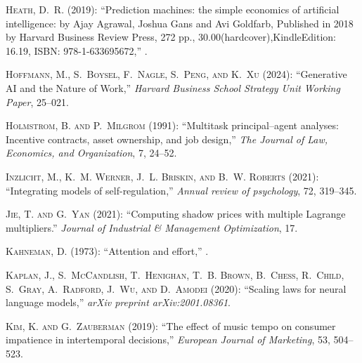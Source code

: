 \begin{thebibliography}{1}
\textsc{Heath, D.~R.} (2019): \enquote{Prediction machines: the simple economics of artificial intelligence: by Ajay Agrawal, Joshua Gans and Avi Goldfarb, Published in 2018 by Harvard Business Review Press, 272 pp., 30.00(hardcover),KindleEdition: 16.19, ISBN: 978-1-633695672,} .

\textsc{Hoffmann, M., S.~Boysel, F.~Nagle, S.~Peng, and K.~Xu} (2024): \enquote{Generative AI and the Nature of Work,} \emph{Harvard Business School Strategy Unit Working Paper}, 25--021.

\textsc{Holmstrom, B. and P.~Milgrom} (1991): \enquote{Multitask principal--agent analyses: Incentive contracts, asset ownership, and job design,} \emph{The Journal of Law, Economics, and Organization}, 7, 24--52.

\textsc{Inzlicht, M., K.~M. Werner, J.~L. Briskin, and B.~W. Roberts} (2021): \enquote{Integrating models of self-regulation,} \emph{Annual review of psychology}, 72, 319--345.

\textsc{Jie, T. and G.~Yan} (2021): \enquote{Computing shadow prices with multiple Lagrange multipliers.} \emph{Journal of Industrial \& Management Optimization}, 17.

\textsc{Kahneman, D.} (1973): \enquote{Attention and effort,} .

\textsc{Kaplan, J., S.~McCandlish, T.~Henighan, T.~B. Brown, B.~Chess, R.~Child, S.~Gray, A.~Radford, J.~Wu, and D.~Amodei} (2020): \enquote{Scaling laws for neural language models,} \emph{arXiv preprint arXiv:2001.08361}.

\textsc{Kim, K. and G.~Zauberman} (2019): \enquote{The effect of music tempo on consumer impatience in intertemporal decisions,} \emph{European Journal of Marketing}, 53, 504--523.


\end{thebibliography}

